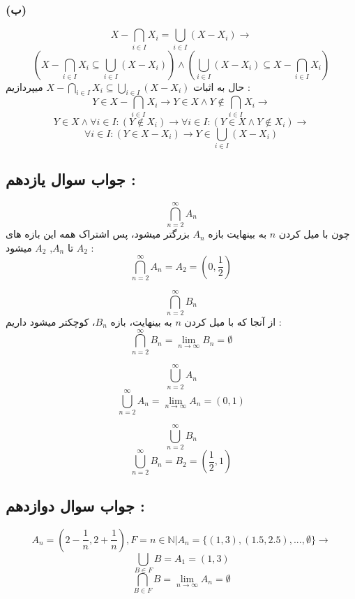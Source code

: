 \documentclass{article}
\begin{document}
            \subsubsection*{(ب)}
                \[X - \bigcap_{i \in I} X_i = \bigcup_{i \in I} (X - X_i) \rightarrow\]
                \[(X - \bigcap_{i \in I} X_i \subseteq \bigcup_{i \in I} (X - X_i)) \land (\bigcup_{i \in I} (X - X_i) \subseteq X - \bigcap_{i \in I} X_i)\]
                حال به اثبات $X - \bigcap_{i \in I} X_i \subseteq \bigcup_{i \in I} (X - X_i)$ میپردازیم :
                \[Y \in X - \bigcap_{i \in I} X_i \rightarrow Y \in X \land Y \not \in \bigcap_{i \in I} X_i \rightarrow\]
                \[Y \in X \land \forall i \in I : (Y \not \in X_i) \rightarrow \forall i \in I : (Y \in X \land Y \not \in X_i) \rightarrow\]
                \[\forall i \in I : (Y \in X - X_i) \rightarrow Y \in \bigcup_{i \in I} (X - X_i)\]

        \subsection*{جواب سوال یازدهم : }
            \[\bigcap_{n=2}^{\infty} A_n\]
            چون با میل کردن $n$ به بینهایت بازه $A_n$ بزرگتر میشود، پس اشتراک همه این بازه های $A_2$ تا $A_n$, $A_2$ میشود :
            \[\bigcap_{n=2}^{\infty} A_n = A_2 = (0, \frac{1}{2})\]

            \[\bigcap_{n=2}^{\infty} B_n\]
            از آنجا که با میل کردن $n$ به بینهایت، بازه $B_n$، کوچکتر میشود داریم :
            \[\bigcap_{n=2}^{\infty} B_n = \lim_{n \to \infty} B_n = \emptyset\]

            \[\bigcup_{n=2}^{\infty} A_n\]
            \[\bigcup_{n=2}^{\infty} A_n = \lim_{n \to \infty} A_n = (0, 1)\]

            \[\bigcup_{n=2}^{\infty} B_n\]
            \[\bigcup_{n=2}^{\infty} B_n = B_2 = (\frac{1}{2}, 1)\]

        \subsection*{جواب سوال دوازدهم : }
            \[A_n = (2 - \frac{1}{n}, 2 + \frac{1}{n}), F = {n \in \mathbb{N} | A_n} = \{(1, 3), (1.5, 2.5), ..., \emptyset\} \rightarrow\]
            \[\bigcup_{B \in F} B = A_1 = (1, 3)\]
            \[\bigcap_{B \in F} B = \lim_{n \to \infty} A_n = \emptyset\]
\end{document}
